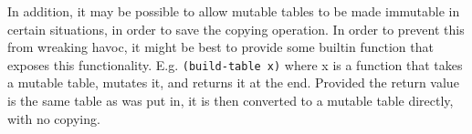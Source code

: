 \documentclass[11pt]{article}
\begin{document}
In addition, it may be possible to allow mutable tables to be made immutable in
certain situations, in order to save the copying operation. In order to prevent
this from wreaking havoc, it might be best to provide some builtin function that
exposes this functionality. E.g. \texttt{(build-table x)} where x is a function that
takes a mutable table, mutates it, and returns it at the end. Provided the
return value is the same table as was put in, it is then converted to a mutable
table directly, with no copying.
\end{document}
